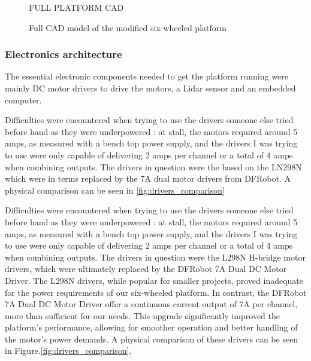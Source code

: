 \documentclass[11pt]{article}
\begin{document}
            \begin{figure}[htbp]
                \centering
                FULL PLATFORM CAD
                \caption{Full CAD model of the modified six-wheeled platform}
                \label{fig:full_cad_model}
            \end{figure}

            \subsubsection{Electronics architecture}
                The essential electronic components needed to get the platform running were mainly DC motor drivers to drive the motors, a Lidar sensor and an embedded computer.
                
                Difficulties were encountered when trying to use the drivers someone else tried before hand as they were underpowered : at stall, the motors required around 5 amps, as measured with a bench top power supply, and the drivers I was trying to use were only capable of delivering 2 amps per channel or a total of 4 amps when combining outputs. The drivers in question were the based on the LN298N which were in terms replaced by the 7A dual motor drivers from DFRobot. A physical comparison can be seen in \ref{fig:drivers_comparison}
                
                Difficulties were encountered when trying to use the drivers someone else tried before hand as they were underpowered : at stall, the motors required around 5 amps, as measured with a bench top power supply, and the drivers I was trying to use were only capable of delivering 2 amps per channel or a total of 4 amps when combining outputs. The drivers in question were the L298N H-bridge motor drivers, which were ultimately replaced by the DFRobot 7A Dual DC Motor Driver. The L298N drivers, while popular for smaller projects, proved inadequate for the power requirements of our six-wheeled platform. In contrast, the DFRobot 7A Dual DC Motor Driver offer a continuous current output of 7A per channel, more than sufficient for our needs. This upgrade significantly improved the platform's performance, allowing for smoother operation and better handling of the motor's power demands. A physical comparison of these drivers can be seen in Figure.\ref{fig:drivers_comparison}.
\end{document}
